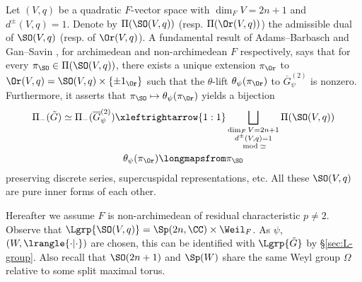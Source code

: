 \documentclass[a4paper,10pt]{article}
\begin{document}
Let $(V,q)$ be a quadratic $F$-vector space with $\dim_F V = 2n+1$ and $d^\pm(V,q) = 1$. Denote by $\Pi(\SO(V,q))$ (resp. $\Pi(\Or(V,q))$) the admissible dual of $\SO(V,q)$ (resp. of $\Or(V,q)$). A fundamental result of Adams--Barbasch \cite{AB98} and Gan--Savin \cite{GS1}, for archimedean and non-archimedean $F$ respectively, says that for every $\pi_{\SO} \in \Pi(\SO(V,q))$, there exists a unique extension $\pi_{\Or}$ to $\Or(V,q) = \SO(V,q) \times \{\pm 1_{\Or}\}$ such that the $\theta$-lift $\theta_\psi(\pi_{\Or})$ to $\overline{G}_\psi^{(2)}$ is nonzero. Furthermore, it asserts that $\pi_{\SO} \mapsto \theta_\psi(\pi_{\Or})$ yields a bijection
\begin{equation}\label{eqn:AB-GS} \begin{aligned}
	\Pi_-(\tilde{G}) \simeq \Pi_-(\overline{G}_\psi^{(2)}) \xleftrightarrow{1:1} & \bigsqcup_{\substack{\dim_F V = 2n+1 \\ d^\pm(V,q) = 1 \\ \bmod \simeq }} \Pi(\SO(V,q)) \\
	\theta_\psi(\pi_{\Or}) \longmapsfrom & \pi_{\SO}
\end{aligned}\end{equation}
preserving discrete series, supercuspidal representations, etc. All these $\SO(V,q)$ are pure inner forms of each other.

Hereafter we assume $F$ is non-archimedean of residual characteristic $p \neq 2$. Observe that $\Lgrp{\SO(V,q)} = \Sp(2n, \CC) \times \Weil_F$. As $\psi$, $(W, \lrangle{\cdot|\cdot})$ are chosen, this can be identified with $\Lgrp{\tilde{G}}$ by \S\ref{sec:L-group}. Also recall that $\SO(2n+1)$ and $\Sp(W)$ share the same Weyl group $\Omega$ relative to some split maximal torus.
\end{document}
